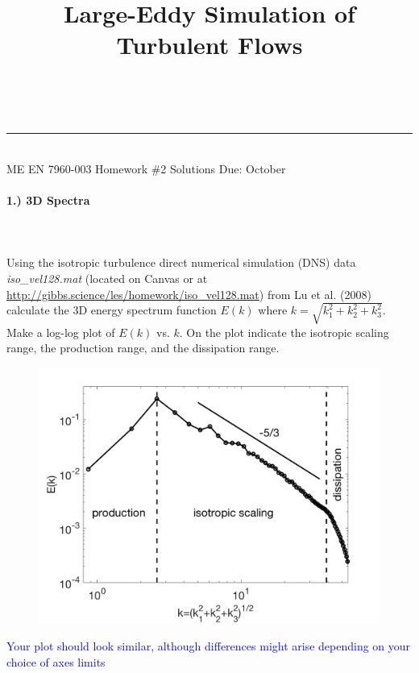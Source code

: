 \documentclass[11pt]{article}
\makeatletter
\newcommand{\linia}{\rule{\linewidth}{0.5pt}}
\renewcommand{\maketitle}{
\begin{center}
\vspace{2ex}
{\huge \textsc{\@title}}
\vspace{1ex}
\\
\linia\\
ME EN 7960-003 \hfill Homework \#2 Solutions \hfill Due: October \nth{7}
\vspace{4ex}
\end{center}
}
\makeatother
\begin{document}
\title{Large-Eddy Simulation of Turbulent Flows}

\maketitle

\vspace{-20pt}
\paragraph{1.) 3D Spectra}~\\\\
Using the isotropic turbulence direct numerical simulation (DNS) data \textit{iso\_vel128.mat} (located on Canvas or at \href{http://gibbs.science/les/homework/iso_vel128.mat}{http://gibbs.science/les/homework/iso\_vel128.mat}) from Lu et al. (2008) calculate the 3D energy spectrum function $E(k)$ where $k = \sqrt{k_1^2 + k_2^2 + k_3^2}$. Make a log-log plot of $E(k)$ vs. $k$. On the plot indicate the isotropic scaling range, the production range, and the dissipation range.
\vspace{50pt}
\begin{figure}[H]
	\centering
	\includegraphics[width=1\textwidth]{3dspectra}
\end{figure}
 
 \textcolor{blue}{Your plot should look similar, although differences might arise depending on your choice of axes limits}
 
\end{document}
